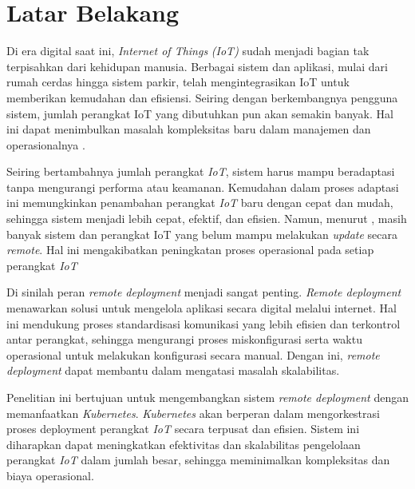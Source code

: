 \section{Latar Belakang}

Di era digital saat ini, \textit{Internet of Things} \textit{(IoT)} sudah menjadi bagian tak terpisahkan dari kehidupan manusia. Berbagai sistem dan aplikasi, mulai dari rumah cerdas hingga sistem parkir, telah mengintegrasikan IoT untuk memberikan kemudahan dan efisiensi. Seiring dengan berkembangnya pengguna sistem, jumlah perangkat IoT yang dibutuhkan pun akan semakin banyak. Hal ini dapat menimbulkan masalah kompleksitas baru dalam manajemen dan operasionalnya \parencite{IOTSmartCity}.

Seiring bertambahnya jumlah perangkat \textit{IoT}, sistem harus mampu beradaptasi tanpa mengurangi performa atau keamanan. Kemudahan dalam proses adaptasi ini memungkinkan penambahan perangkat \textit{IoT} baru dengan cepat dan mudah, sehingga sistem menjadi lebih cepat, efektif, dan efisien. Namun, menurut \parencite{RemoteDeployment}, masih banyak sistem dan perangkat IoT yang belum mampu melakukan \textit{update} secara \textit{remote}. Hal ini mengakibatkan peningkatan proses operasional pada setiap perangkat \textit{IoT}

Di sinilah peran \textit{remote deployment} menjadi sangat penting. \textit{Remote deployment} menawarkan solusi untuk mengelola aplikasi secara digital melalui internet. Hal ini mendukung proses standardisasi komunikasi yang lebih efisien dan terkontrol antar perangkat, sehingga mengurangi proses miskonfigurasi serta waktu operasional untuk melakukan konfigurasi secara manual. Dengan ini, \textit{remote deployment} dapat membantu dalam mengatasi masalah skalabilitas.

Penelitian ini bertujuan untuk mengembangkan sistem \textit{remote deployment} dengan memanfaatkan \textit{Kubernetes}. \textit{Kubernetes} akan berperan dalam mengorkestrasi proses deployment perangkat \textit{IoT} secara terpusat dan efisien. Sistem ini diharapkan dapat meningkatkan efektivitas dan skalabilitas pengelolaan perangkat \textit{IoT} dalam jumlah besar, sehingga meminimalkan kompleksitas dan biaya operasional.